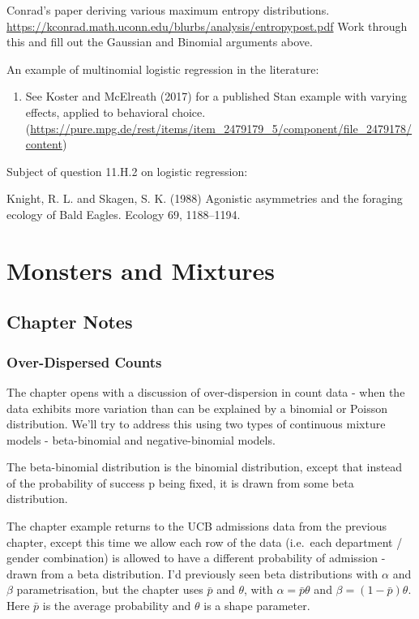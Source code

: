 \documentclass[
]{book}
\providecommand{\tightlist}{%
  \setlength{\itemsep}{0pt}\setlength{\parskip}{0pt}}
\begin{document}
Conrad's paper deriving various maximum entropy distributions. \url{https://kconrad.math.uconn.edu/blurbs/analysis/entropypost.pdf}
Work through this and fill out the Gaussian and Binomial arguments above.

An example of multinomial logistic regression in the literature:

\begin{enumerate}
\def\labelenumi{\arabic{enumi}.}
\setcounter{enumi}{178}
\tightlist
\item
  See Koster and McElreath (2017) for a published Stan example with varying effects, applied to behavioral choice.
  (\url{https://pure.mpg.de/rest/items/item_2479179_5/component/file_2479178/content})
\end{enumerate}

Subject of question 11.H.2 on logistic regression:

Knight, R. L. and Skagen, S. K. (1988) Agonistic asymmetries and the foraging ecology of Bald Eagles. Ecology 69, 1188--1194.

\hypertarget{monsters_mixtures}{%
\chapter{Monsters and Mixtures}\label{monsters_mixtures}}

\hypertarget{chapter-notes-11}{%
\section{Chapter Notes}\label{chapter-notes-11}}

\hypertarget{over-dispersed-counts}{%
\subsection*{Over-Dispersed Counts}\label{over-dispersed-counts}}

The chapter opens with a discussion of over-dispersion in count data - when the data exhibits more variation than can be explained by a binomial or Poisson distribution. We'll try to address this using two types of continuous mixture models - beta-binomial and negative-binomial models.

The beta-binomial distribution is the binomial distribution, except that instead of the probability of success p being fixed, it is drawn from some beta distribution.

The chapter example returns to the UCB admissions data from the previous chapter, except this time we allow each row of the data (i.e.~each department / gender combination) is allowed to have a different probability of admission - drawn from a beta distribution. I'd previously seen beta distributions with \(\alpha\) and \(\beta\) parametrisation, but the chapter uses \(\bar{p}\) and \(\theta\), with \(\alpha = \bar{p}\theta\) and \(\beta = (1-\bar{p})\theta\). Here \(\bar{p}\) is the average probability and \(\theta\) is a shape parameter.
\end{document}
